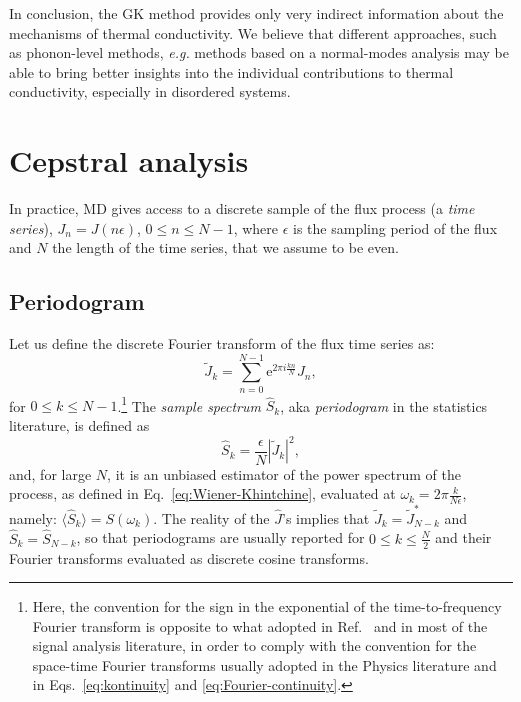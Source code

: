 \begin{LEtext}
In conclusion, the GK method provides only very indirect information about the mechanisms of thermal conductivity. We believe that different approaches, such as phonon-level methods, \emph{e.g.} methods based on a normal-modes analysis \cite{Esfarjani2011} may be able to bring better insights into the individual contributions to thermal conductivity, especially in disordered systems. 
\end{LEtext}


\section{Cepstral analysis}  \label{sec:cepstral-analysis}

In practice, MD gives access to a discrete sample of the flux process (a \emph{time series}), $J_n = J(n \epsilon)$, $0 \leq n \leq N-1$, where $\epsilon$ is the sampling period of the flux and $N$ the length of the time series, that we assume to be even. 


\subsection{Periodogram}
Let us define the discrete Fourier transform of the flux time series as:
\begin{equation}
  \tilde{J}_{k}=\sum_{n=0}^{N-1} \mathrm{e}^{ 2\pi i\frac{kn}{N}} J_n, \label{eq:Jk}
\end{equation}
for $0 \leq k \leq N-1$.\footnote{Here, the convention for the sign in the exponential of the time-to-frequency Fourier transform is opposite to what adopted in Ref.~\cite{Ercole2017} and in most of the signal analysis literature, in order to comply with the convention for the space-time Fourier transforms usually adopted in the Physics literature and in Eqs.~\eqref{eq:kontinuity} and \eqref{eq:Fourier-continuity}.}
The \emph{sample spectrum} $\hat S_k$, aka \emph{periodogram} in the statistics literature, is defined as
\begin{equation}
\hat{S}_{k}=\frac{\epsilon}{N} \left |\tilde{J}_{k} \right |^2, \label{eq:periodogram-def}
\end{equation}
and, for large $N$, it is an unbiased estimator of the power spectrum of the process, as defined in Eq.~\eqref{eq:Wiener-Khintchine}, evaluated at $\omega_k=2\pi\frac{k}{N\epsilon}$, namely: $\langle \hat S_k \rangle = S(\omega_k)$. The reality of the $\hat J$'s implies that $\tilde J_k=\tilde J^*_{N-k}$ and $\hat S_k=\hat S_{N-k}$, so that periodograms are usually reported for $0\leq k\leq \frac{N}{2}$ and their Fourier transforms evaluated as discrete cosine transforms.

